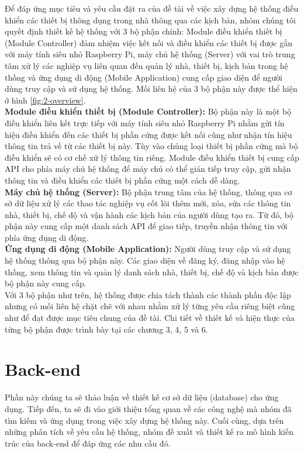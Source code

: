 \documentclass[12pt,a4paper,oneside]{extbook}
\begin{document}
Để đáp ứng mục tiêu và yêu cầu đặt ra của đề tài về việc xây dựng hệ thống điều khiển các thiết bị thông dụng trong nhà thông qua các kịch bản, nhóm chúng tôi quyết định thiết kế hệ thống với 3 bộ phận chính: Module điều khiển thiết bị (Module Controller) đảm nhiệm việc kết nối và điều khiển các thiết bị được gắn với máy tính siêu nhỏ Raspberry Pi, máy chủ hệ thống (Server) với vai trò trung tâm xử lý các nghiệp vụ liên quan đến quản lý nhà, thiết bị, kịch bản trong hệ thống và ứng dụng di động (Mobile Application) cung cấp giao diện để người dùng truy cập và sử dụng hệ thống. Mối liên hệ của 3 bộ phận này được thể hiện ở hình \ref{fig:2-overview}.\\

\noindent
\textbf{Module điều khiển thiết bị (Module Controller):} Bộ phận này là một bộ điều khiển liên kết trực tiếp với máy tính siêu nhỏ Raspberry Pi nhằm gửi tín hiệu điều khiển đến các thiết bị phần cứng được kết nối cũng như nhận tín hiệu thông tin trả về từ các thiết bị này. Tùy vào chủng loại thiết bị phần cứng mà bộ điều khiển sẽ có cơ chế xử lý thông tin riêng. Module điều khiển thiết bị cung cấp API cho phía máy chủ hệ thống để máy chủ có thể gián tiếp truy cập, gửi nhận thông tin và điều khiển các thiết bị phần cứng một cách dễ dàng.\\

\noindent
\textbf{Máy chủ hệ thống (Server):} Bộ phận trung tâm của hệ thống, thông qua cơ sở dữ liệu xử lý các thao tác nghiệp vụ cốt lõi thêm mới, xóa, sửa các thông tin nhà, thiết bị, chế độ và vận hành các kịch bản của người dùng tạo ra. Từ đó, bộ phận này cung cấp một danh sách API để giao tiếp, truyền nhận thông tin với phía ứng dụng di động.\\

\noindent
\textbf{Ứng dụng di động (Mobile Application):} Người dùng truy cập và sử dụng hệ thống thông qua bộ phận này. Các giao diện về đăng ký, đăng nhập vào hệ thống, xem thông tin và quản lý danh sách nhà, thiết bị, chế độ và kịch bản được bộ phận này cung cấp.\\

\noindent
Với 3 bộ phận như trên, hệ thống được chia tách thành các thành phần độc lập nhưng có mối liên hệ chặt chẽ với nhau nhằm xử lý từng yêu cầu riêng biệt cũng như để đạt được mục tiêu chung của đề tài. Chi tiết về thiết kế và hiện thực của từng bộ phận được trình bày tại các chương 3, 4, 5 và 6.

\chapter{Back-end}
Phần này chúng ta sẽ thảo luận về thiết kế cơ sở dữ liệu (database) cho ứng dụng. Tiếp đến, ta sẽ đi vào giới thiệu tổng quan về các công nghệ mà nhóm đã tìm kiếm và ứng dụng trong việc xây dựng hệ thống này. Cuối cùng, dựa trên những phân tích về yêu cầu hệ thống, nhóm đề xuất và thiết kế ra mô hình kiến trúc của back-end để đáp ứng các nhu cầu đó.
\end{document}
